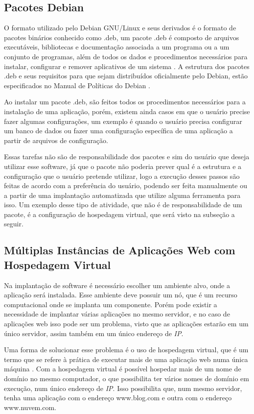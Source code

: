 \subsection{Pacotes Debian}

O formato utilizado pelo Debian GNU/Linux e seus derivados é o formato de pacotes
binários conhecido como .deb, um pacote .deb é composto de arquivos executáveis,
bibliotecas e documentação associada a um programa ou a um conjunto de programas,
além de todos os dados e procedimentos necessários para instalar, configurar e remover
aplicativos de um sistema \cite{araujo2011apprecommender}. A estrutura dos pacotes 
.deb e seus requisitos para que sejam distribuídos oficialmente pelo Debian,
estão especificados no Manual de Políticas do Debian \cite{debian}.

Ao instalar um pacote .deb, são feitos todos os procedimentos necessários para a instalação
de uma aplicação, porém, existem ainda casos em que o usuário precise fazer algumas
configurações, um exemplo é quando o usuário precisa configurar um banco de dados
ou fazer uma configuração específica de uma aplicação a partir de arquivos de configuração.

Essas tarefas não são de responsabilidade dos pacotes e sim do usuário que deseja utilizar esse
software, já que o pacote não poderia prever qual é a estrutura e a configuração
que o usuário pretende utilizar, logo a execução desses passos são feitas de
acordo com a preferência do usuário, podendo ser feita manualmente ou a partir
de uma implantação automatizada que utilize alguma ferramenta para isso. Um exemplo
desse tipo de atividade, que não é de responsabilidade de um pacote, é a configuração
de hospedagem virtual, que será visto na subseção a seguir.

\subsection{Múltiplas Instâncias de Aplicações Web com Hospedagem Virtual}

Na implantação de software é necessário escolher um ambiente alvo, onde a aplicação
será instalada. Esse ambiente deve possuir um nó, que é um recurso computacional
onde se implanta um componente. Porém pode
existir a necessidade de implantar várias aplicações no mesmo servidor, e no caso
de aplicações web isso pode ser um problema, visto que as aplicações estarão em um
único servidor, assim também em um único endereço de \textit{IP}.

Uma forma de solucionar esse problema é o uso de hospedagem virtual, que é um 
termo que se refere à prática de executar mais de uma aplicação web numa única 
máquina \cite{apachvh}. Com a hospedagem virtual é possível
hospedar mais de um nome de domínio no mesmo computador, o que possibilita ter
vários nomes de domínio em execução, num único endereço de \textit{IP}. Isso
possibilita que, num mesmo servidor, tenha uma aplicação com o endereço
 www.blog.com e outra com o endereço www.nuvem.com. 

